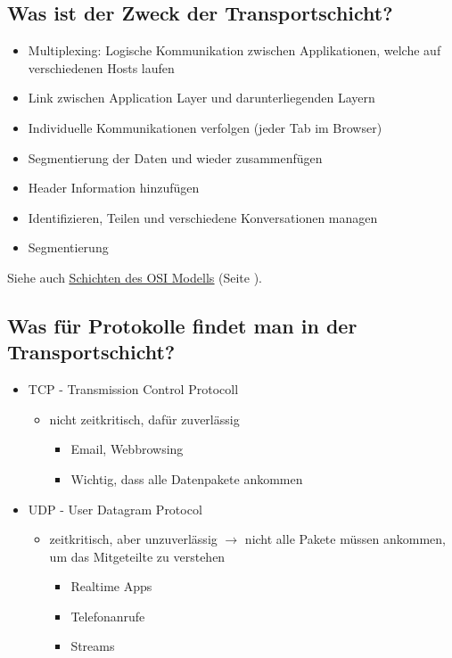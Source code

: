 \subsection*{Was ist der Zweck der Transportschicht?}
\begin{itemize}
    \item Multiplexing: Logische Kommunikation zwischen Applikationen, welche auf verschiedenen Hosts laufen
    \item Link zwischen Application Layer und darunterliegenden Layern
    \item Individuelle Kommunikationen verfolgen (jeder Tab im Browser)
    \item Segmentierung der Daten und wieder zusammenfügen
    \item Header Information hinzufügen
    \item Identifizieren, Teilen und verschiedene Konversationen managen
    \item Segmentierung
\end{itemize}
Siehe auch \underline{\hyperref[sub:SchichtenOSIModell]{Schichten des OSI Modells}} (Seite \pageref{sub:SchichtenOSIModell}).

\subsection*{Was für Protokolle findet man in der Transportschicht?}
\begin{itemize}
    \item TCP - Transmission Control Protocoll
    \begin{itemize}
        \item nicht zeitkritisch, dafür zuverlässig
        \begin{itemize}
            \item Email, Webbrowsing
            \item Wichtig, dass alle Datenpakete ankommen
        \end{itemize}
    \end{itemize}
    \item UDP - User Datagram Protocol
    \begin{itemize}
        \item zeitkritisch, aber unzuverlässig $\rightarrow$ nicht alle Pakete müssen ankommen, um das Mitgeteilte zu verstehen
        \begin{itemize}
            \item Realtime Apps
            \item Telefonanrufe
            \item Streams
        \end{itemize}
    \end{itemize}
\end{itemize}

